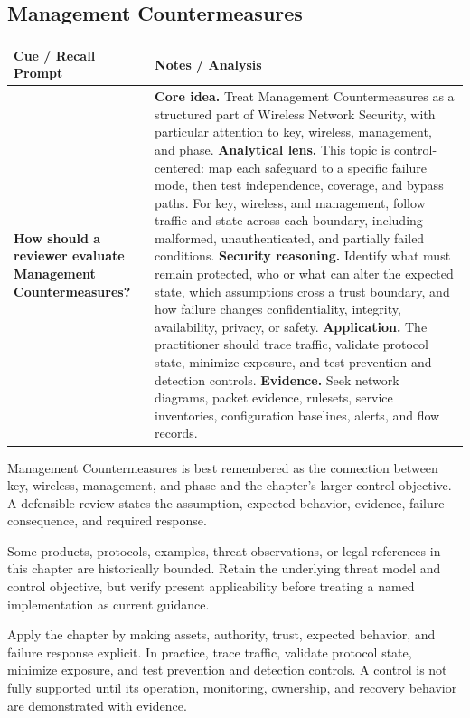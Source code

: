 \documentclass[11pt]{article}
\newcommand{\CornellHeader}{%
\rowcolor{Navy}\color{white}\bfseries Cue / Recall Prompt & \color{white}\bfseries Notes / Analysis\\\hline}
\newcommand{\CornellRow}[2]{%
\cellcolor{CueGray}\RaggedRight\textbf{#1} & \RaggedRight #2\\\hline}
\begin{document}
\subsection*{Management Countermeasures}
\begin{longtable}{>{\RaggedRight\arraybackslash}p{}|>{\RaggedRight\arraybackslash}p{}}
\CornellHeader
\CornellRow{How should a reviewer evaluate Management Countermeasures?}{\textbf{Core idea.} Treat Management Countermeasures as a structured part of Wireless Network Security, with particular attention to key, wireless, management, and phase. \textbf{Analytical lens.} This topic is control-centered: map each safeguard to a specific failure mode, then test independence, coverage, and bypass paths. For key, wireless, and management, follow traffic and state across each boundary, including malformed, unauthenticated, and partially failed conditions. \textbf{Security reasoning.} Identify what must remain protected, who or what can alter the expected state, which assumptions cross a trust boundary, and how failure changes confidentiality, integrity, availability, privacy, or safety. \textbf{Application.} The practitioner should trace traffic, validate protocol state, minimize exposure, and test prevention and detection controls. \textbf{Evidence.} Seek network diagrams, packet evidence, rulesets, service inventories, configuration baselines, alerts, and flow records.}
\end{longtable}
\begin{topicsummary}
Management Countermeasures is best remembered as the connection between key, wireless, management, and phase and the chapter's larger control objective. A defensible review states the assumption, expected behavior, evidence, failure consequence, and required response.
\end{topicsummary}
\begin{historybox}
Some products, protocols, examples, threat observations, or legal references in this chapter are historically bounded. Retain the underlying threat model and control objective, but verify present applicability before treating a named implementation as current guidance.
\end{historybox}
\begin{defensebox}
Apply the chapter by making assets, authority, trust, expected behavior, and failure response explicit. In practice, trace traffic, validate protocol state, minimize exposure, and test prevention and detection controls. A control is not fully supported until its operation, monitoring, ownership, and recovery behavior are demonstrated with evidence.
\end{defensebox}
\end{document}
